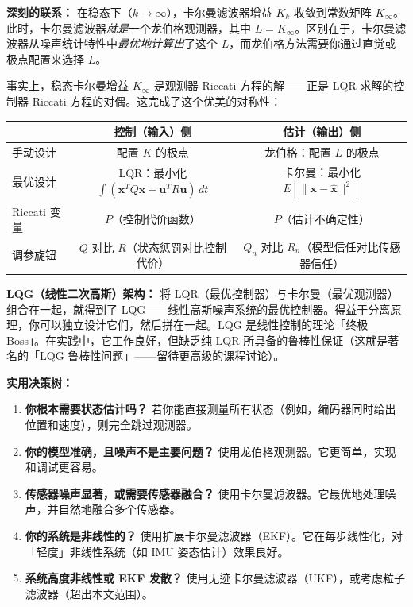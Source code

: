 \textbf{深刻的联系：} 在稳态下（$k \to \infty$），卡尔曼滤波器增益 $K_k$ 收敛到常数矩阵 $K_\infty$。此时，卡尔曼滤波器\textit{就是}一个龙伯格观测器，其中 $L = K_\infty$。区别在于，卡尔曼滤波器从噪声统计特性中\textit{最优地计算出}了这个 $L$，而龙伯格方法需要你通过直觉或极点配置来选择 $L$。

事实上，稳态卡尔曼增益 $K_\infty$ 是观测器 Riccati 方程的解——正是 LQR 求解的控制器 Riccati 方程的对偶。这完成了这个优美的对称性：

\begin{center}
\begin{tabular}{lcc}
\toprule
 & \textbf{控制（输入）侧} & \textbf{估计（输出）侧} \\
\midrule
手动设计 & 配置 $K$ 的极点 & 龙伯格：配置 $L$ 的极点 \\
最优设计 & LQR：最小化 $\int (\mathbf{x}^TQ\mathbf{x} + \mathbf{u}^TR\mathbf{u})\,dt$ & 卡尔曼：最小化 $E[\|\mathbf{x} - \hat{\mathbf{x}}\|^2]$ \\
Riccati 变量 & $P$（控制代价函数） & $P$（估计不确定性） \\
调参旋钮 & $Q$ 对比 $R$（状态惩罚对比控制代价） & $Q_n$ 对比 $R_n$（模型信任对比传感器信任） \\
\bottomrule
\end{tabular}
\end{center}

\textbf{LQG（线性二次高斯）架构：} 将 LQR（最优控制器）与卡尔曼（最优观测器）组合在一起，就得到了 LQG——线性高斯噪声系统的最优控制器。得益于分离原理，你可以独立设计它们，然后拼在一起。LQG 是线性控制的理论「终极 Boss」。在实践中，它工作良好，但缺乏纯 LQR 所具备的鲁棒性保证（这就是著名的「LQG 鲁棒性问题」——留待更高级的课程讨论）。

\textbf{实用决策树：}
\begin{enumerate}
    \item \textbf{你根本需要状态估计吗？} 若你能直接测量所有状态（例如，编码器同时给出位置和速度），则完全跳过观测器。
    \item \textbf{你的模型准确，且噪声不是主要问题？} 使用龙伯格观测器。它更简单，实现和调试更容易。
    \item \textbf{传感器噪声显著，或需要传感器融合？} 使用卡尔曼滤波器。它最优地处理噪声，并自然地融合多个传感器。
    \item \textbf{你的系统是非线性的？} 使用扩展卡尔曼滤波器（EKF）。它在每步线性化，对「轻度」非线性系统（如 IMU 姿态估计）效果良好。
    \item \textbf{系统高度非线性或 EKF 发散？} 使用无迹卡尔曼滤波器（UKF），或考虑粒子滤波器（超出本文范围）。
\end{enumerate}

